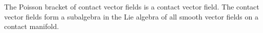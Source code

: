 The Poisson bracket of contact vector fields is a contact vector field. The contact vector fields form a subalgebra in the Lie algebra of all smooth vector fields on a contact manifold.
